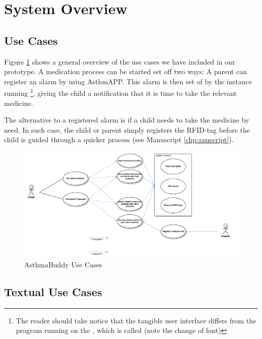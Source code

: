 \section{System Overview}
\label{sec:systemoverview}

\subsection{Use Cases}
Figure \ref{fig:pi-use-cases} shows a general overview of the use cases we have included in our prototype. A medication process can be started set off two ways:
A parent can register an alarm by using AsthmAPP. This alarm is then set of by the  instance running \footnote{The reader should take notice that the tangible user interface \ab{} differs from the program running on the \rpi{}, which is called (note the change of font)}, giving the child a notification that it is time to take the relevant medicine.

The alternative to a registered alarm is if a child needs to take the medicine by need. In such case, the child or parent simply registers the RFID-tag before the child is guided through a quicker process (see Manuscript \ref{chp:anuscript}).  

\begin{figure}[H] 
	\centering
		\includegraphics[width=0.8\paperwidth]{Pictures/usecases.png}
	\caption{AsthmaBuddy Use Cases}
	\label{fig:pi-use-cases}
\end{figure}

\subsection{Textual Use Cases}
\label{sec:textualusecasebyneed}

